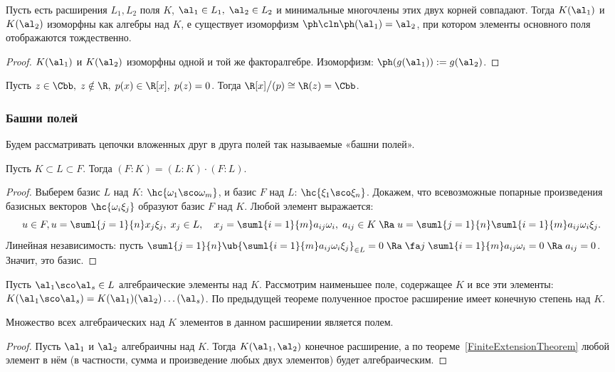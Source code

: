 \documentclass[a4paper]{article}
\begin{document}
\begin{stm}
Пусть есть расширения $L_1, L_2$ поля $K$, $\al_1 \in L_1, \; \al_2 \in L_2$ и минимальные  многочлены
этих двух корней совпадают. Тогда $K(\al_1)$ и $K(\al_2)$ изоморфны как алгебры над $K$, е
существует изоморфизм $\ph\cln \ph(\al_1)=\al_2$, при котором элементы основного поля отображаются
тождественно.
\end{stm}
\begin{proof}
$K(\al_1)$ и $K(\al_2)$ изоморфны одной и той же факторалгебре. Изоморфизм: $\ph(g(\al_1)):=g(\al_2)$.
\end{proof}

\begin{ex}
Пусть $z \in \Cbb, \; z \notin \R, \; p(x) \in \R[x], \; p(z)=0$. Тогда $\R[x]\bigl/(p) \cong \R(z) = \Cbb$.
\end{ex}

\subsubsection{Башни полей}

Будем рассматривать цепочки вложенных друг в друга полей так называемые «башни полей».

\begin{theorem}
Пусть $K \subset L \subset F$. Тогда $(F:K)=(L:K)\cdot (F:L)$.
\end{theorem}
\begin{proof}
Выберем базис $L$ над $K$: $\hc{\omega_1 \sco \omega_m}$, и базис $F$ над $L$: $\hc{\xi_1 \sco \xi_n}$. Докажем,
что всевозможные попарные произведения базисных векторов $\hc{\omega_i \xi_j}$ образуют базис $F$ над $K$.
Любой элемент выражается:
$$u \in F, u=\suml{j=1}{n}x_j\xi_j, \; x_j\in L, \quad x_j = \suml{i=1}{m}a_{ij}\omega_i, \; a_{ij} \in K \; \Ra \; u= \suml{j=1}{n}\suml{i=1}{m}a_{ij}\omega_i\xi_j.$$
Линейная независимость: пусть $\suml{j=1}{n}\ub{\suml{i=1}{m}a_{ij}\omega_i\xi_j}_{\in L} =0 \; \Ra \; \fa j \; \suml{i=1}{m}a_{ij}\omega_i=0 \; \Ra \; a_{ij}=0$.
Значит, это базис.
\end{proof}

\begin{imp}
Пусть $\al_1 \sco \al_s \in L$ алгебраические элементы над $K$. Рассмотрим наименьшее поле,
содержащее $K$ и все эти элементы: $K(\al_1 \sco \al_s) = K(\al_1)(\al_2)\ldots(\al_s)$. По
предыдущей теореме полученное простое расширение имеет конечную степень над $K$.
\end{imp}

\begin{imp}
Множество всех алгебраических над $K$ элементов в данном расширении является полем.
\end{imp}
\begin{proof}
Пусть $\al_1$ и $\al_2$ алгебраичны над $K$. Тогда $K(\al_1, \al_2)$ конечное
расширение, а по теореме~\ref{FiniteExtensionTheorem} любой элемент в нём (в частности, сумма
и произведение любых двух элементов) будет алгебраическим.
\end{proof}
\end{document}
